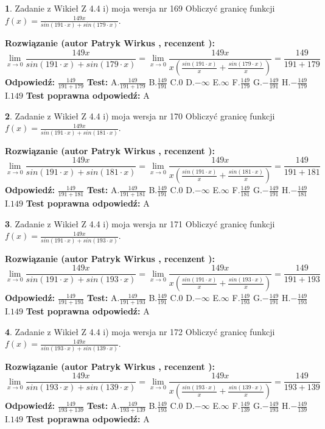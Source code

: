 \documentclass[12pt, a4paper]{article}
\theoremstyle{definition} %
\newtheorem{zad}{}
\newcommand{\zadStart}[1]{\begin{zad}#1\newline}
\newcommand{\zadStop}{\end{zad}}
\newcommand{\rozwStart}[2]{\noindent \textbf{Rozwiązanie (autor #1 , recenzent #2): }\newline}
\newcommand{\rozwStop}{\newline}
\newcommand{\odpStart}{\noindent \textbf{Odpowiedź:}\newline}
\newcommand{\odpStop}{\newline}
\newcommand{\testStart}{\noindent \textbf{Test:}\newline}
\newcommand{\testStop}{\newline}
\newcommand{\kluczStart}{\noindent \textbf{Test poprawna odpowiedź:}\newline}
\newcommand{\kluczStop}{\newline}
\begin{document}
\zadStart{Zadanie z Wikieł Z 4.4 i) moja wersja nr 169}
Obliczyć granicę funkcji $f(x)=\frac{149x}{sin(191\cdot x) +sin(179\cdot x)}$.
\zadStop
\rozwStart{Patryk Wirkus}{}
$$\lim\limits_{x\to 0}\frac{149x}{sin(191\cdot x) +sin(179\cdot x)}=\lim\limits_{x\to 0}\frac{149x}{x(\frac{sin(191\cdot x)}{x}+\frac{sin(179\cdot x)}{x})}=\frac{149}{191+179}$$
\rozwStop
\odpStart
$\frac{149}{191+179}$
\odpStop
\testStart
A.$\frac{149}{191+179}$
B.$\frac{149}{191}$
C.$0$
D.$-\infty$
E.$\infty$
F.$\frac{149}{179}$
G.$-\frac{149}{191}$
H.$-\frac{149}{179}$
I.$149$
\testStop
\kluczStart
A
\kluczStop



\zadStart{Zadanie z Wikieł Z 4.4 i) moja wersja nr 170}
Obliczyć granicę funkcji $f(x)=\frac{149x}{sin(191\cdot x) +sin(181\cdot x)}$.
\zadStop
\rozwStart{Patryk Wirkus}{}
$$\lim\limits_{x\to 0}\frac{149x}{sin(191\cdot x) +sin(181\cdot x)}=\lim\limits_{x\to 0}\frac{149x}{x(\frac{sin(191\cdot x)}{x}+\frac{sin(181\cdot x)}{x})}=\frac{149}{191+181}$$
\rozwStop
\odpStart
$\frac{149}{191+181}$
\odpStop
\testStart
A.$\frac{149}{191+181}$
B.$\frac{149}{191}$
C.$0$
D.$-\infty$
E.$\infty$
F.$\frac{149}{181}$
G.$-\frac{149}{191}$
H.$-\frac{149}{181}$
I.$149$
\testStop
\kluczStart
A
\kluczStop



\zadStart{Zadanie z Wikieł Z 4.4 i) moja wersja nr 171}
Obliczyć granicę funkcji $f(x)=\frac{149x}{sin(191\cdot x) +sin(193\cdot x)}$.
\zadStop
\rozwStart{Patryk Wirkus}{}
$$\lim\limits_{x\to 0}\frac{149x}{sin(191\cdot x) +sin(193\cdot x)}=\lim\limits_{x\to 0}\frac{149x}{x(\frac{sin(191\cdot x)}{x}+\frac{sin(193\cdot x)}{x})}=\frac{149}{191+193}$$
\rozwStop
\odpStart
$\frac{149}{191+193}$
\odpStop
\testStart
A.$\frac{149}{191+193}$
B.$\frac{149}{191}$
C.$0$
D.$-\infty$
E.$\infty$
F.$\frac{149}{193}$
G.$-\frac{149}{191}$
H.$-\frac{149}{193}$
I.$149$
\testStop
\kluczStart
A
\kluczStop



\zadStart{Zadanie z Wikieł Z 4.4 i) moja wersja nr 172}
Obliczyć granicę funkcji $f(x)=\frac{149x}{sin(193\cdot x) +sin(139\cdot x)}$.
\zadStop
\rozwStart{Patryk Wirkus}{}
$$\lim\limits_{x\to 0}\frac{149x}{sin(193\cdot x) +sin(139\cdot x)}=\lim\limits_{x\to 0}\frac{149x}{x(\frac{sin(193\cdot x)}{x}+\frac{sin(139\cdot x)}{x})}=\frac{149}{193+139}$$
\rozwStop
\odpStart
$\frac{149}{193+139}$
\odpStop
\testStart
A.$\frac{149}{193+139}$
B.$\frac{149}{193}$
C.$0$
D.$-\infty$
E.$\infty$
F.$\frac{149}{139}$
G.$-\frac{149}{193}$
H.$-\frac{149}{139}$
I.$149$
\testStop
\kluczStart
A
\kluczStop
\end{document}
